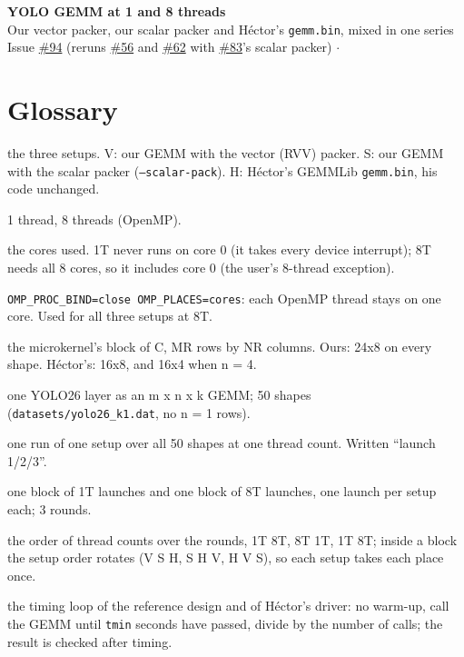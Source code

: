 \documentclass[10pt,a4paper]{article}
\newcommand{\iss}[1]{\href{https://github.com/JieGH/RVV_code_gen_via_MLIR_xDSL/issues/#1}{\##1}}
\newcommand{\D}{data}
\begin{document}
\sloppy
\begin{center}
{\Large\bfseries YOLO GEMM at 1 and 8 threads}\\[4pt]
Our vector packer, our scalar packer and H\'ector's \texttt{gemm.bin}, mixed in one series\\[2pt]
Issue \iss{94} (reruns \iss{56} and \iss{62} with \iss{83}'s scalar packer) \quad$\cdot$\quad 
\end{center}

\section*{Glossary}
\begin{description}\setlength\itemsep{0pt}\small
\item[V, S, H] the three setups. V: our GEMM with the vector (RVV) packer. S: our GEMM with the scalar packer (\texttt{--scalar-pack}). H: H\'ector's GEMMLib \texttt{gemm.bin}, his code unchanged.
\item[1T, 8T] 1 thread, 8 threads (OpenMP).
\item[core 4, cores 0--7] the cores used. 1T never runs on core 0 (it takes every device interrupt); 8T needs all 8 cores, so it includes core 0 (the user's 8-thread exception).
\item[thread binding] \texttt{OMP\_PROC\_BIND=close OMP\_PLACES=cores}: each OpenMP thread stays on one core. Used for all three setups at 8T.
\item[tile MRxNR] the microkernel's block of C, MR rows by NR columns. Ours: 24x8 on every shape. H\'ector's: 16x8, and 16x4 when n = 4.
\item[shape] one YOLO26 layer as an m x n x k GEMM; 50 shapes (\texttt{datasets/yolo26\_k1.dat}, no n = 1 rows).
\item[launch] one run of one setup over all 50 shapes at one thread count. Written ``launch 1/2/3''.
\item[round] one block of 1T launches and one block of 8T launches, one launch per setup each; 3 rounds.
\item[A-B-B-A order] the order of thread counts over the rounds, 1T 8T, 8T 1T, 1T 8T; inside a block the setup order rotates (V S H, S H V, H V S), so each setup takes each place once.
\item[reference protocol] the timing loop of the reference design and of H\'ector's driver: no warm-up, call the GEMM until \texttt{tmin} seconds have passed, divide by the number of calls; the result is checked after timing.

\end{description}
\end{document}
